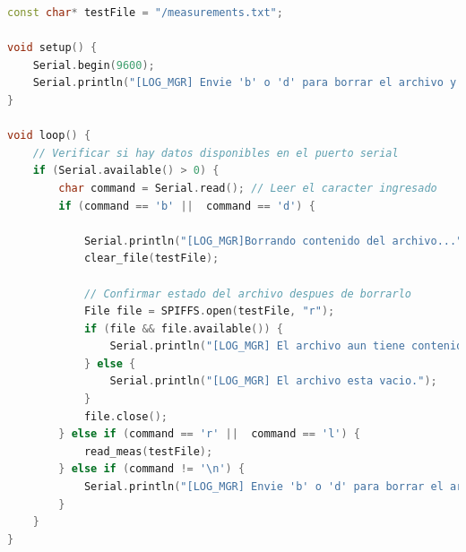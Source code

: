 \begin{itemize}
\begin{lstlisting}[captionpos=b, caption={Programa lectura o eliminación de fichero}, language=c++]
const char* testFile = "/measurements.txt";

void setup() {
    Serial.begin(9600);
    Serial.println("[LOG_MGR] Envie 'b' o 'd' para borrar el archivo y 'r' o 'l' para leerlo ");
}

void loop() {
    // Verificar si hay datos disponibles en el puerto serial
    if (Serial.available() > 0) {
        char command = Serial.read(); // Leer el caracter ingresado
        if (command == 'b' ||  command == 'd') {

            Serial.println("[LOG_MGR]Borrando contenido del archivo...");
            clear_file(testFile);

            // Confirmar estado del archivo despues de borrarlo
            File file = SPIFFS.open(testFile, "r");
            if (file && file.available()) {
                Serial.println("[LOG_MGR] El archivo aun tiene contenido.");
            } else {
                Serial.println("[LOG_MGR] El archivo esta vacio.");
            }
            file.close();
        } else if (command == 'r' ||  command == 'l') {
            read_meas(testFile);
        } else if (command != '\n') {
            Serial.println("[LOG_MGR] Envie 'b' o 'd' para borrar el archivo y 'r' o 'l' para leerlo ");
        }
    }
}
    \end{lstlisting}
\end{itemize}

